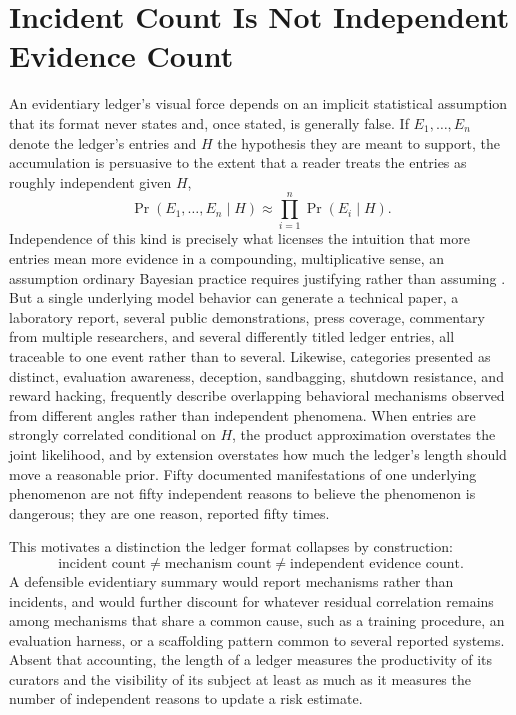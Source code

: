 \section{Incident Count Is Not Independent Evidence Count}

An evidentiary ledger's visual force depends on an implicit statistical assumption that its format never states and, once stated, is generally false. If $E_1, \ldots, E_n$ denote the ledger's entries and $H$ the hypothesis they are meant to support, the accumulation is persuasive to the extent that a reader treats the entries as roughly independent given $H$,
\[
\Pr(E_1, \ldots, E_n \mid H) \approx \prod_{i=1}^{n} \Pr(E_i \mid H).
\]
Independence of this kind is precisely what licenses the intuition that more entries mean more evidence in a compounding, multiplicative sense, an assumption ordinary Bayesian practice requires justifying rather than assuming \cite{gelman2013}. But a single underlying model behavior can generate a technical paper, a laboratory report, several public demonstrations, press coverage, commentary from multiple researchers, and several differently titled ledger entries, all traceable to one event rather than to several. Likewise, categories presented as distinct, evaluation awareness, deception, sandbagging, shutdown resistance, and reward hacking, frequently describe overlapping behavioral mechanisms observed from different angles rather than independent phenomena. When entries are strongly correlated conditional on $H$, the product approximation overstates the joint likelihood, and by extension overstates how much the ledger's length should move a reasonable prior. Fifty documented manifestations of one underlying phenomenon are not fifty independent reasons to believe the phenomenon is dangerous; they are one reason, reported fifty times.

This motivates a distinction the ledger format collapses by construction:
\[
\text{incident count} \neq \text{mechanism count} \neq \text{independent evidence count}.
\]
A defensible evidentiary summary would report mechanisms rather than incidents, and would further discount for whatever residual correlation remains among mechanisms that share a common cause, such as a training procedure, an evaluation harness, or a scaffolding pattern common to several reported systems. Absent that accounting, the length of a ledger measures the productivity of its curators and the visibility of its subject at least as much as it measures the number of independent reasons to update a risk estimate.

